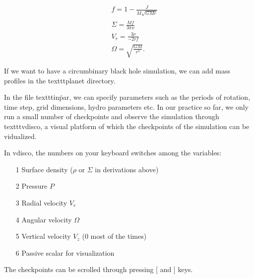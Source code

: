 \documentclass{article}
\begin{document}
\begin{eqnarray}
    && f = 1 - \frac{\dot J}{ \dot M \sqrt{GMr}} \nonumber \\
    && \Sigma = \frac{\dot M f }{ 3 \pi \nu} \nonumber \\
    && V_r = \frac{3\nu}{-2rf} \nonumber \\
    && \Omega = \sqrt{\frac{GM}{r^3}}.
\end{eqnarray}



If we want to have a circumbinary black hole simulation, we can add mass profiles in the texttt{planet} directory. 



In the file texttt{in\.par}, we can specify parameters such as the periods of rotation, time step, grid dimensions, hydro parameters etc.
In our practice so far, we only run a small number of checkpoints and observe the simulation through texttt{vdisco}, a visual
platform of which the checkpoints of the simulation can be vidualized. 

In vdisco, the numbers on your keyboard switches among the variables:
\begin{enumerate}
    \item [1] Surface density ($\rho$ or $\Sigma$ in derivations above)
    \item [2] Pressure $P$
    \item [3] Radial velocity $V_r$
    \item [4] Angular velocity $\Omega$
    \item [5] Vertical velocity $V_z$ ($0$ most of the times)
    \item [6] Passive scalar for visualization 
\end{enumerate}

The checkpoints can be scrolled through pressing [ and ] keys. 
\end{document}
